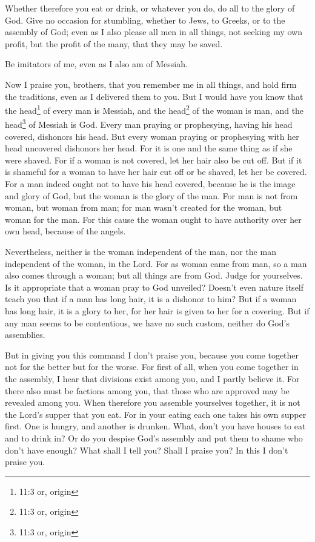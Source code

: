 \myverse{}Whether therefore you eat or drink, or whatever you do, do all
to the glory of God.
\myverse{}Give no occasion for stumbling, whether to Jews, to Greeks, or to the assembly
of God;
\myverse{}even as I also please all men in all things, not seeking my own profit, but
the profit of the many, that they may be saved.


\mychapter{} \myverse*{}Be imitators of me, even as I also am of Messiah.

\quad\quad \myverse{}Now I praise you, brothers, that you remember me in all things,
and hold firm the traditions, even as I delivered them to you.
\myverse{}But I would have you know that the head\footnote{11:3 or, origin} of every man is Messiah, and the head\footnote{11:3 or, origin} of the woman is man, and the head\footnote{11:3 or, origin} of Messiah is God.
\myverse{}Every man praying or prophesying, having his head covered, dishonors his head.
\myverse{}But every woman praying or prophesying with her head uncovered dishonors her
head. For it is one and the same thing as if she were shaved.
\myverse{}For if a woman is not covered, let her hair also be cut off. But if it is shameful
for a woman to have her hair cut off or be shaved, let her be covered.
\myverse{}For a man indeed ought not to have his head covered, because he is the image
and glory of God, but the woman is the glory of the man.
\myverse{}For man is not from woman, but woman from man;
\myverse{}for man wasn’t created for the woman, but woman for the man.
\myverse{}For this cause the woman ought to have authority over her own head, because
of the angels.

\myverse{}Nevertheless, neither is the woman independent of the man, nor
the man independent of the woman, in the Lord.
\myverse{}For as woman came from man, so a man also comes through a woman; but all
things are from God.
\myverse{}Judge for yourselves. Is it appropriate that a woman pray to God unveiled?
\myverse{}Doesn’t even nature itself teach you that if a man has long hair, it is a
dishonor to him?
\myverse{}But if a woman has long hair, it is a glory to her, for her hair is given
to her for a covering.
\myverse{}But if any man seems to be contentious, we have no such custom, neither do
God’s assemblies.

\myverse{}But in giving you this command I don’t praise you, because you
come together not for the better but for the worse.
\myverse{}For first of all, when you come together in the assembly, I hear that divisions
exist among you, and I partly believe it.
\myverse{}For there also must be factions among you, that those who are approved may be revealed among you.
\myverse{}When therefore you assemble yourselves together, it is not the Lord’s supper
that you eat.
\myverse{}For in your eating each one takes his own supper first. One is hungry, and
another is drunken.
\myverse{}What, don’t you have houses to eat and to drink in? Or do you despise God’s
assembly and put them to shame who don’t have enough? What shall I tell you? Shall I praise you? In this
I don’t praise you.

